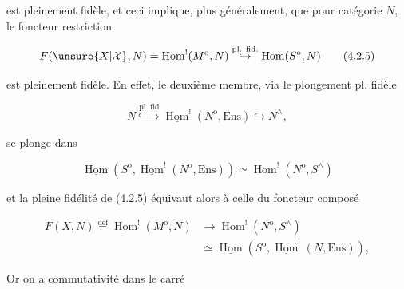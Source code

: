 est pleinement fidèle, et ceci implique, plus généralement, que pour   catégorie $N$, le foncteur restriction

\[
F(\unsure{X|\mathcal X},N)=\underline{\operatorname{Hom}}^{!}(M^{\mathrm{o}},N)
\overset{\text{pl. fid.}}{\hookrightarrow}\underline{\operatorname{Hom}}(S^{\mathrm{o}},N)
\tag*{(4.2.5)}
\]

est pleinement fidèle. En effet, le deuxième membre, via le plongement pl. fidèle

\[
N\overset{\text{pl. fid}}{\hookrightarrow}\underline{\operatorname{Hom}}^{!}(N^{\mathrm{o}},\mathrm{Ens})\hookrightarrow N^{\wedge},
\]

 se plonge dans

\[
\underline{\operatorname{Hom}}(S^{\mathrm{o}},\underline{\operatorname{Hom}}^{!}(N^{\mathrm{o}},\mathrm{Ens}))
\simeq \operatorname{Hom}^{!}(N^{\mathrm{o}},S^{\wedge})
\]

et la pleine fidélité de (4.2.5) équivaut alors à celle du foncteur composé

\[
\begin{aligned}
F(X,N)\overset{\mathrm{def}}{=}\underline{\operatorname{Hom}}^{!}(M^{\mathrm{o}},N)&\longrightarrow
\operatorname{Hom}^{!}(N^{\mathrm{o}},S^{\wedge})\\
&\simeq\underline{\operatorname{Hom}}(S^{\mathrm{o}},\underline{\operatorname{Hom}}^{!}(N,\mathrm{Ens})),
\end{aligned}
\tag*{(4.2.6)}
\]

Or on a commutativité dans le carré


